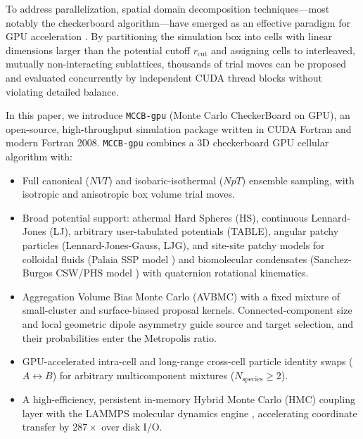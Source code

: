 \documentclass[final,5p,times,twocolumn]{elsarticle}
\begin{document}
To address parallelization, spatial domain decomposition
techniques—most notably the checkerboard algorithm—have
emerged as an effective paradigm for GPU acceleration
\cite{preis2009gpu,anderson2013checkerboard}. By partitioning the
simulation box into cells with linear dimensions larger than the
potential cutoff $r_{\text{cut}}$ and assigning cells to interleaved,
mutually non-interacting sublattices, thousands of trial moves can be
proposed and evaluated concurrently by independent CUDA thread blocks
without violating detailed balance. 

In this paper, we introduce \texttt{MCCB-gpu} (Monte Carlo
CheckerBoard on GPU), an open-source, high-throughput simulation
package written in CUDA Fortran and modern Fortran
2008. \texttt{MCCB-gpu} combines a 3D checkerboard GPU cellular  algorithm
with: 
\begin{itemize}
    \item Full canonical ($NVT$) and isobaric-isothermal ($NpT$) ensemble sampling, with isotropic and anisotropic box volume trial moves.
    \item Broad potential support: athermal Hard Spheres (HS), continuous Lennard-Jones (LJ), arbitrary user-tabulated potentials (TABLE), angular patchy particles (Lennard-Jones-Gauss, LJG)\cite{Doye07,Noya21}, and site-site patchy models for colloidal fluids (Palaia SSP model \cite{palaia2022patchy}) and biomolecular condensates (Sanchez-Burgos CSW/PHS model \cite{sanchezburgos2021size}) with quaternion rotational kinematics.
    \item %
    Aggregation Volume Bias Monte Carlo (AVBMC)
 \cite{chen2000avbmc,chen2001avbmc} with a fixed mixture of
 small-cluster and surface-biased proposal kernels. Connected-component
 size and local geometric dipole asymmetry guide source and target
 selection, and their probabilities enter the Metropolis ratio.

    \item GPU-accelerated intra-cell and long-range cross-cell particle identity swaps ($A \leftrightarrow B$) for arbitrary multicomponent mixtures ($N_{\text{species}} \ge 2$).
    \item A high-efficiency, persistent in-memory Hybrid Monte Carlo (HMC) coupling layer with the LAMMPS molecular dynamics engine \cite{thompson2022lammps}, accelerating coordinate transfer by $287\times$ over disk I/O.
\end{itemize}
\end{document}
